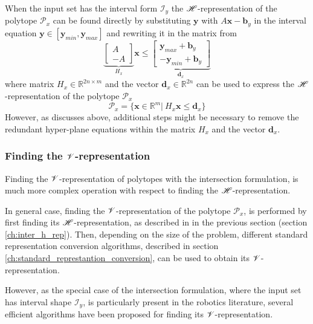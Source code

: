When the input set has the interval form $\mathcal{I}_y$ the $\mathscr{H}$-representation of the polytope $\mathcal{P}_x$ can be found directly by substituting $\bm{y}$ with $A\bm{x}-\bm{b}_y$ in the interval equation $\bm{y}\in[\bm{y}_{min},\bm{y}_{max}]$ and rewriting it in the matrix from
\begin{equation}
   \underbrace{\begin{bmatrix}
        A\\
        -A
    \end{bmatrix}}_{H_x}\bm{x} \leq \underbrace{\begin{bmatrix}
         \bm{y}_{max} + \bm{b}_y\\
        -\bm{y}_{min} + \bm{b}_y 
    \end{bmatrix} }_{\bm{d}_x}
\end{equation}
where matrix $H_x\in\mathbb{R}^{2n \times m}$ and the vector $\bm{d}_x\in\mathbb{R}^{2n}$ can be used to express the $\mathscr{H}$-representation of the polytope $\mathcal{P}_x$
\begin{equation}
    \mathcal{P}_x=\{\bm{x}\in\mathbb{R}^m |~ H_x\bm{x} \leq \bm{d}_x \}
    \label{eq:inter_h_rep}
\end{equation}
However, as discusses above, additional steps might be necessary to remove the redundant hyper-plane equations within the matrix $H_x$ and the vector $\bm{d}_x$.


\subsubsection{Finding the $\mathscr{V}$-representation} 

Finding the $\mathscr{V}$-representation of polytopes with the intersection formulation, is much more complex operation with respect to finding the $\mathscr{H}$-representation. 

In general case, finding the $\mathscr{V}$-representation of the polytope $\mathcal{P}_x$, is performed by first finding its $\mathscr{H}$-representation, as described in in the previous section (section \ref{ch:inter_h_rep}). Then, depending on the size of the problem, different standard representation conversion algorithms, described in section \ref{ch:standard_represtantion_conversion}, can be used to obtain its $\mathscr{V}$-representation.

However, as the special case of the intersection formulation, where the input set has interval shape $\mathcal{I}_y$, is particularly present in the robotics literature, several efficient algorithms have been proposed for finding its $\mathscr{V}$-representation.



